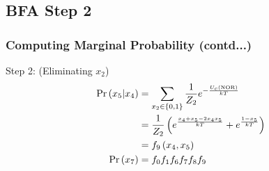 \documentclass{beamer}
\begin{document}
\subsection{BFA Step 2}
\begin{frame}
\frametitle{Computing Marginal Probability (contd...)}
\begin{flushleft}
Step 2: (Eliminating $x_2$)
\begin{align}
    \Pr\left(x_5|x_4\right) &= \sum_{x_2 \in \left\{0,1\right\}} \frac{1}{Z_2}e^{-\frac{U_c\left(\text{NOR}\right)}{kT}}\\
    &= \frac{1}{Z_2}\left(e^{\frac{x_4+x_5-2x_4x_5}{kT}} + e^{\frac{1-x_5}{kT}}\right)\\
    &= f_9\left(x_4,x_5\right)\\
    \Pr\left(x_7\right) &= f_0f_1f_6f_7f_8f_9
\end{align}
\end{flushleft}
\end{frame}
\end{document}
